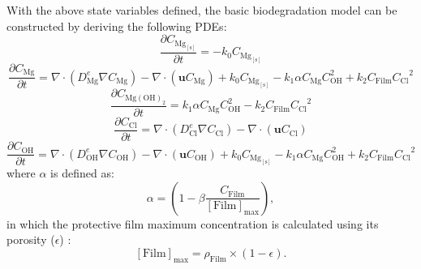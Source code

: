 With the above state variables defined, the basic biodegradation model can be constructed by deriving the following \gls{PDE}s:
\begin{equation} \label{eq:kinetics_pde_mg_solid}
\frac{\partial C_{\mathrm{Mg}_\mathrm{[s]}}}{\partial t}=-k_{0}C_{\mathrm{Mg}_\mathrm{[s]}}
\end{equation}
\begin{equation} \label{eq:kinetics_pde_mg}
\frac{\partial C_{\mathrm{Mg}}}{\partial t}=\nabla \cdot \left(D_{\mathrm{Mg}}^{e}  \nabla C_{\mathrm{Mg}} \right)-\nabla \cdot \left({\mathbf u} C_{\mathrm{Mg}} \right)+k_{0}C_{\mathrm{Mg}_\mathrm{[s]}}-k_{1}\alpha C_{\mathrm{Mg}}C_{\mathrm{OH}}^2 +k_{2} C_{\mathrm{Film}} {C_{\mathrm{Cl}}}^{2}
\end{equation}
\begin{equation} \label{eq:kinetics_pde_film}
\frac{\partial C_{\mathrm{Mg}(\mathrm{OH})_{2}}}{\partial t}=k_{1}\alpha C_{\mathrm{Mg}}C_{\mathrm{OH}}^2 -k_{2} C_{\mathrm{Film}} {C_{\mathrm{Cl}}}^{2}
\end{equation}
\begin{equation} \label{eq:kinetics_pde_cl}
\frac{\partial C_{\mathrm{Cl}}}{\partial t}=\nabla \cdot \left(D_{\mathrm{Cl}}^{e}  \nabla C_{\mathrm{Cl}} \right)-\nabla \cdot \left({\mathbf u} C_{\mathrm{Cl}} \right)
\end{equation}
\begin{equation} \label{eq:kinetics_pde_oh}
\frac{\partial C_{\mathrm{OH}}}{\partial t}=\nabla \cdot \left(D_{\mathrm{OH}}^{e}  \nabla C_{\mathrm{OH}} \right)-\nabla \cdot \left({\mathbf u} C_{\mathrm{OH}} \right)+k_{0}C_{\mathrm{Mg}_\mathrm{[s]}}-k_{1}\alpha C_{\mathrm{Mg}}C_{\mathrm{OH}}^2 +k_{2} C_{\mathrm{Film}} {C_{\mathrm{Cl}}}^{2}
\end{equation}
where $\alpha$ is defined as:
\begin{equation} \label{eq:kinetics_film_alpha}
\alpha=\left(1-\beta \frac{C_{\mathrm{Film}}}{[\mathrm{Film}]_{\max }}\right),
\end{equation}
in which the protective film maximum concentration is calculated using its porosity ($\epsilon$) \cite{Bajger2016}:
\begin{equation} \label{eq:kinetics_film_max}
[\mathrm{Film}]_{\max }=\rho_{\mathrm{Film}} \times(1-\epsilon).
\end{equation}

